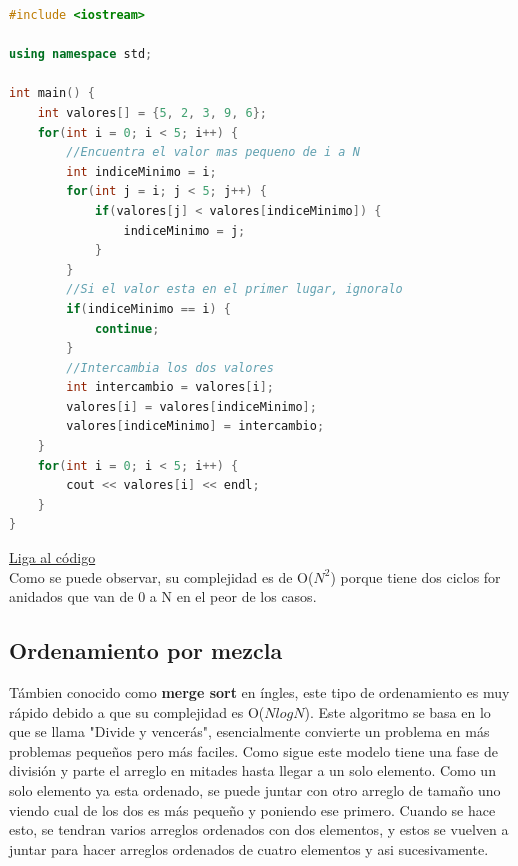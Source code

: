\documentclass{article}
\begin{document}
\begin{lstlisting}[language=C++, title=Ordenamiento por selección]
#include <iostream>

using namespace std;

int main() {
	int valores[] = {5, 2, 3, 9, 6};
	for(int i = 0; i < 5; i++) {
		//Encuentra el valor mas pequeno de i a N
		int indiceMinimo = i;
		for(int j = i; j < 5; j++) {
			if(valores[j] < valores[indiceMinimo]) {
				indiceMinimo = j;
			}
		}
		//Si el valor esta en el primer lugar, ignoralo
		if(indiceMinimo == i) {
			continue;
		}
		//Intercambia los dos valores
		int intercambio = valores[i];
		valores[i] = valores[indiceMinimo];
		valores[indiceMinimo] = intercambio;
	}
	for(int i = 0; i < 5; i++) {
		cout << valores[i] << endl;
	}
}
\end{lstlisting}
\href{https://repl.it/@Jamesscn/Ordenamiento-de-seleccion}{Liga al código} \\

Como se puede observar, su complejidad es de O($N^2$) porque tiene dos ciclos for anidados que van de 0 a N en el peor de los casos.

\subsection{Ordenamiento por mezcla}

Támbien conocido como \textbf{merge sort} en íngles, este tipo de ordenamiento es muy rápido debido a que su complejidad es O($N log N$). Este algoritmo se basa en lo que se llama "Divide y vencerás", esencialmente convierte un problema en más problemas pequeños pero más faciles. Como sigue este modelo tiene una fase de división y parte el arreglo en mitades hasta llegar a un solo elemento. Como un solo elemento ya esta ordenado, se puede juntar con otro arreglo de tamaño uno viendo cual de los dos es más pequeño y poniendo ese primero. Cuando se hace esto, se tendran varios arreglos ordenados con dos elementos, y estos se vuelven a juntar para hacer arreglos ordenados de cuatro elementos y asi sucesivamente.
\end{document}
